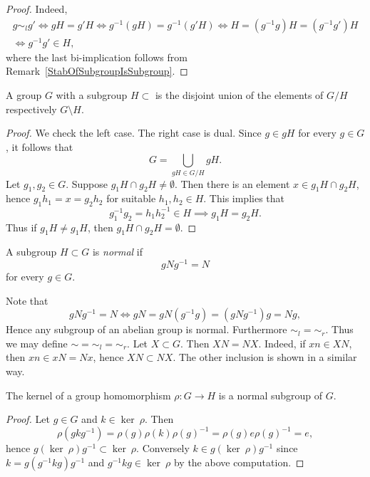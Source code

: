 \begin{proof}
    Indeed, 
    \begin{gather*}
        g \sim_l g' \iff gH = g'H \iff g^{-1}(gH) = g^{-1}(g'H) \iff  H = \left(g^{-1}g \right)H = \left(g^{-1}g'\right)H\\ \iff g^{-1}g'\in H, 
    \end{gather*}
    where the last bi-implication follows from Remark~\ref{StabOfSubgroupIsSubgroup}.
\end{proof}
\begin{proposition}
    A group $G$ with a subgroup $H\subset $ is the disjoint union of the elements of $G/H$ respectively $G\setminus H$.
\end{proposition}
\begin{proof}
    We check the left case. The right case is dual. Since $g\in gH$ for every $g\in G$, it follows that 
    $$G= \bigcup_{gH \in G/H} gH.$$
    Let $g_1,g_2\in G$. Suppose $g_1H\cap g_2H \neq \emptyset$. Then there is an element $x\in g_1H\cap g_2H$, hence $g_1h_1 = x =g_2h_2$ for suitable $h_1,h_2\in H$. This implies that 
    $$g_1^{-1}g_2 = h_1h_2^{-1} \in H \implies g_1H = g_2H.$$
    Thus if $g_1H \neq g_1H$, then $g_1H\cap g_2H = \emptyset$.
\end{proof}
\begin{definition}
    A subgroup $H\subset G$ is \textit{normal} if 
    $$g N g^{-1} = N$$
    for every $g\in G$.
\end{definition}
\begin{remark}\label{ReformulationOfNormalSubgroupAndAllSubgroupsOfAbelianGroupsAreNormal}
    Note that 
    $$gNg^{-1} = N \iff gN = gN(g^{-1}g)=(gNg^{-1})g = Ng,$$
    Hence any subgroup of an abelian group is normal. Furthermore $\sim_l = \sim_r$. Thus we may define $\sim = \sim_l= \sim_r$.
    Let $X\subset G$. Then $XN = NX$. Indeed, if $xn \in XN$, then $xn \in xN=Nx$, hence $XN\subset NX$. The other inclusion is shown in a similar way. 
\end{remark}
\begin{lemma}\label{KernelIsNormalSubgroup}
    The kernel of a group homomorphism $\rho : G \rightarrow H$ is a normal subgroup of $G$.
\end{lemma}
\begin{proof}
    Let $g\in G$ and $k \in \ker \ \rho$. Then 
    $$\rho\left(gkg^{-1}\right) = \rho(g)\rho(k)\rho(g)^{-1} = \rho(g)e\rho(g)^{-1} = e,$$
    hence $g(\ker \ \rho)g^{-1}\subset \ker \ \rho$. Conversely $k\in g (\ker \ \rho) g^{-1}$ since $k = g\left(g^{-1}kg\right)g^{-1}$ and $g^{-1}kg\in \ker \ \rho$ by the above computation.
\end{proof}
